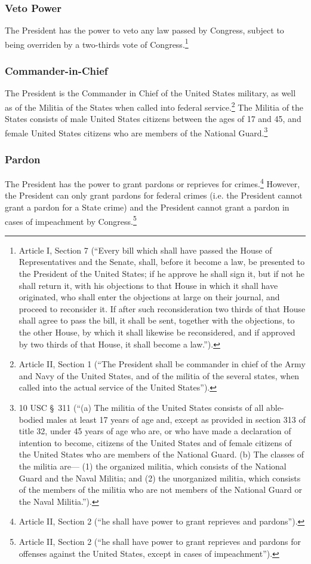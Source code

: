 \subsubsection{Veto Power}
The President has the power to veto any law passed by Congress, subject to being overriden by a two-thirds vote of Congress.\footnote{Article I, Section 7  (``Every bill which shall have passed the House of Representatives and the Senate, shall, before it become a law, be presented to the President of the United States; if he approve he shall sign it, but if not he shall return it, with his objections to that House in which it shall have originated, who shall enter the objections at large on their journal, and proceed to reconsider it. If after such reconsideration two thirds of that House shall agree to pass the bill, it shall be sent, together with the objections, to the other House, by which it shall likewise be reconsidered, and if approved by two thirds of that House, it shall become a law.'').}

\subsubsection{Commander-in-Chief}
The President is the Commander in Chief of the United States military, as well as of the Militia of the States when called into federal service.\footnote{Article II, Section 1 (``The President shall be commander in chief of the Army and Navy of the United States, and of the militia of the several states, when called into the actual service of the United States'').}
The Militia of the States consists of male United States citizens between the ages of 17 and 45, and female United States citizens who are members of the National Guard.\footnote{10 USC \S\ 311 (``(a) The militia of the United States consists of all able-bodied males at least 17 years of age and, except as provided in section 313 of title 32, under 45 years of age who are, or who have made a declaration of intention to become, citizens of the United States and of female citizens of the United States who are members of the National Guard.  (b) The classes of the militia are— (1) the organized militia, which consists of the National Guard and the Naval Militia; and (2) the unorganized militia, which consists of the members of the militia who are not members of the National Guard or the Naval Militia.'').}

\subsubsection{Pardon}
The President has the power to grant pardons or reprieves for crimes.\footnote{Article II, Section 2 (``he shall have power to grant reprieves and pardons'').}  However, the President can only grant pardons for federal crimes (i.e. the President cannot grant a pardon for a State crime) and the President cannot grant a pardon in cases of impeachment by Congress.\footnote{Article II, Section 2 (``he shall have power to grant reprieves and pardons for offenses against the United States, except in cases of impeachment'').}

